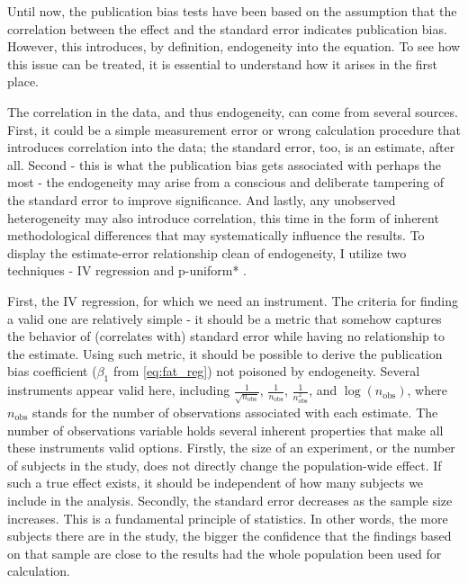 Until now, the publication bias tests have been based on the assumption that the correlation between the effect and the standard error indicates publication bias. However, this introduces, by definition, endogeneity into the equation. To see how this issue can be treated, it is essential to understand how it arises in the first place.

The correlation in the data, and thus endogeneity, can come from several sources. First, it could be a simple measurement error or wrong calculation procedure that introduces correlation into the data; the standard error, too, is an estimate, after all. Second - this is what the publication bias gets associated with perhaps the most - the endogeneity may arise from a conscious and deliberate tampering of the standard error to improve significance. And lastly, any unobserved heterogeneity may also introduce correlation, this time in the form of inherent methodological differences that may systematically influence the results. To display the estimate-error relationship clean of endogeneity, I utilize two techniques - \ac{IV} regression and p-uniform* \citep{vanAert2021puni}.

First, the \ac{IV} regression, for which we need an instrument. The criteria for finding a valid one are relatively simple - it should be a metric that somehow captures the behavior of (correlates with) standard error while having no relationship to the estimate. Using such metric, it should be possible to derive the publication bias coefficient ($\beta_1$ from \autoref{eq:fat_reg}) not poisoned by endogeneity. Several instruments appear valid here, including $\frac{1}{\sqrt{n_{\text{obs}}}}$, $\frac{1}{n_{\text{obs}}}$, $\frac{1}{n_{\text{obs}}^2}$, and $\log(n_{\text{obs}})$, where $n_{\text{obs}}$ stands for the number of observations associated with each estimate. The number of observations variable holds several inherent properties that make all these instruments valid options. Firstly, the size of an experiment, or the number of subjects in the study, does not directly change the population-wide effect. If such a true effect exists, it should be independent of how many subjects we include in the analysis. Secondly, the standard error decreases as the sample size increases. This is a fundamental principle of statistics. In other words, the more subjects there are in the study, the bigger the confidence that the findings based on that sample are close to the results had the whole population been used for calculation.

